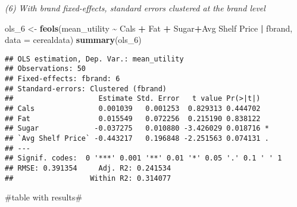 \documentclass[
]{article}
\newenvironment{Shaded}{\begin{snugshade}}{\end{snugshade}}
\newcommand{\AttributeTok}[1]{\textcolor[rgb]{0.13,0.29,0.53}{#1}}
\newcommand{\FunctionTok}[1]{\textcolor[rgb]{0.13,0.29,0.53}{\textbf{#1}}}
\newcommand{\NormalTok}[1]{#1}
\newcommand{\OtherTok}[1]{\textcolor[rgb]{0.56,0.35,0.01}{#1}}
\newcommand{\SpecialCharTok}[1]{\textcolor[rgb]{0.81,0.36,0.00}{\textbf{#1}}}
\newcommand{\StringTok}[1]{\textcolor[rgb]{0.31,0.60,0.02}{#1}}
\begin{document}
\emph{(6) With brand fixed-effects, standard errors clustered at the
brand level}

\begin{Shaded}
\begin{Highlighting}[]
\NormalTok{ols\_6 }\OtherTok{\textless{}{-}} \FunctionTok{feols}\NormalTok{(mean\_utility }\SpecialCharTok{\textasciitilde{}}\NormalTok{ Cals }\SpecialCharTok{+}\NormalTok{ Fat }\SpecialCharTok{+}\NormalTok{ Sugar}\SpecialCharTok{+}\StringTok{\textasciigrave{}}\AttributeTok{Avg Shelf Price}\StringTok{\textasciigrave{}} \SpecialCharTok{|}\NormalTok{ fbrand,  }\AttributeTok{data =}\NormalTok{ cerealdata)}
\FunctionTok{summary}\NormalTok{(ols\_6)}
\end{Highlighting}
\end{Shaded}

\begin{verbatim}
## OLS estimation, Dep. Var.: mean_utility
## Observations: 50
## Fixed-effects: fbrand: 6
## Standard-errors: Clustered (fbrand) 
##                    Estimate Std. Error   t value Pr(>|t|)    
## Cals               0.001039   0.001253  0.829313 0.444702    
## Fat                0.015549   0.072256  0.215190 0.838122    
## Sugar             -0.037275   0.010880 -3.426029 0.018716 *  
## `Avg Shelf Price` -0.443217   0.196848 -2.251563 0.074131 .  
## ---
## Signif. codes:  0 '***' 0.001 '**' 0.01 '*' 0.05 '.' 0.1 ' ' 1
## RMSE: 0.391354     Adj. R2: 0.241534
##                  Within R2: 0.314077
\end{verbatim}

\#table with results\#
\end{document}
